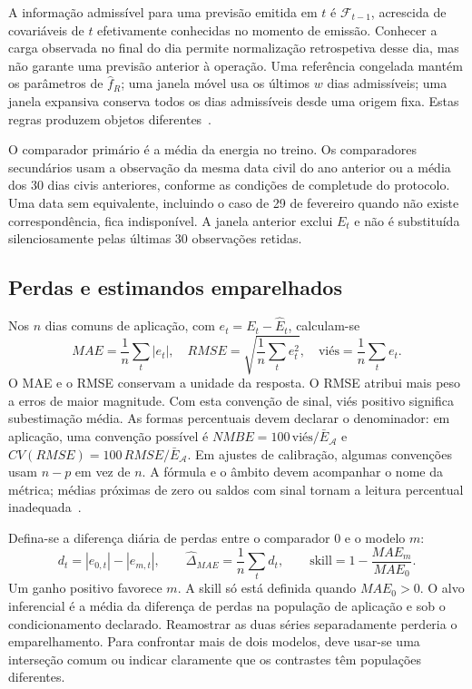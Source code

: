 A informação admissível para uma previsão emitida em $t$ é $\mathcal F_{t-1}$, acrescida de covariáveis de $t$ efetivamente conhecidas no momento de emissão. Conhecer a carga observada no final do dia permite normalização retrospetiva desse dia, mas não garante uma previsão anterior à operação. Uma referência congelada mantém os parâmetros de $\widehat f_R$; uma janela móvel usa os últimos $w$ dias admissíveis; uma janela expansiva conserva todos os dias admissíveis desde uma origem fixa. Estas regras produzem objetos diferentes~\parencite{PesaranTimmermann2007}.

O comparador primário é a média da energia no treino. Os comparadores secundários usam a observação da mesma data civil do ano anterior ou a média dos 30 dias civis anteriores, conforme as condições de completude do protocolo. Uma data sem equivalente, incluindo o caso de 29 de fevereiro quando não existe correspondência, fica indisponível. A janela anterior exclui $E_t$ e não é substituída silenciosamente pelas últimas 30 observações retidas.

\subsection{Perdas e estimandos emparelhados}
\label{sec:mat-perdas}
Nos $n$ dias comuns de aplicação, com $e_t=E_t-\widehat E_t$, calculam-se
\begin{equation}
MAE=\frac1n\sum_t|e_t|,
\quad RMSE=\sqrt{\frac1n\sum_te_t^2},
\quad \mathrm{viés}=\frac1n\sum_te_t.
\label{eq:mat-perdas}
\end{equation}
O MAE e o RMSE conservam a unidade da resposta. O RMSE atribui mais peso a erros de maior magnitude. Com esta convenção de sinal, viés positivo significa subestimação média. As formas percentuais devem declarar o denominador: em aplicação, uma convenção possível é $NMBE=100\,\mathrm{viés}/\bar E_{\mathcal A}$ e $CV(RMSE)=100\,RMSE/\bar E_{\mathcal A}$. Em ajustes de calibração, algumas convenções usam $n-p$ em vez de $n$. A fórmula e o âmbito devem acompanhar o nome da métrica; médias próximas de zero ou saldos com sinal tornam a leitura percentual inadequada~\parencite{HyndmanKoehler2006}.

Defina-se a diferença diária de perdas entre o comparador $0$ e o modelo $m$:
\begin{equation}
d_t=|e_{0,t}|-|e_{m,t}|,
\qquad \widehat\Delta_{MAE}=\frac1n\sum_td_t,
\qquad \mathrm{skill}=1-\frac{MAE_m}{MAE_0}.
\label{eq:mat-ganho}
\end{equation}
Um ganho positivo favorece $m$. A skill só está definida quando $MAE_0>0$. O alvo inferencial é a média da diferença de perdas na população de aplicação e sob o condicionamento declarado. Reamostrar as duas séries separadamente perderia o emparelhamento. Para confrontar mais de dois modelos, deve usar-se uma interseção comum ou indicar claramente que os contrastes têm populações diferentes.

